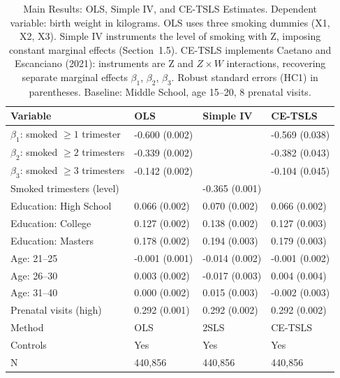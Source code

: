 \begin{table}[h!]
\centering
\caption{Main Results: OLS, Simple IV, and CE-TSLS Estimates. Dependent variable: birth weight in kilograms. OLS uses three smoking dummies (X1, X2, X3). Simple IV instruments the level of smoking with Z, imposing constant marginal effects (Section~1.5). CE-TSLS implements Caetano and Escanciano (2021): instruments are Z and $Z \times W$ interactions, recovering separate marginal effects $\beta_1$, $\beta_2$, $\beta_3$. Robust standard errors (HC1) in parentheses. Baseline: Middle School, age 15--20, 8 prenatal visits.} 
\label{tab:main_results}
\begingroup\small
\begin{tabular}{llll}
  \toprule
Variable & OLS & Simple IV & CE-TSLS \\ 
  \midrule
$\beta_1$: smoked $\geq 1$ trimester & -0.600 (0.002) &  & -0.569 (0.038) \\ 
  $\beta_2$: smoked $\geq 2$ trimesters & -0.339 (0.002) &  & -0.382 (0.043) \\ 
  $\beta_3$: smoked $\geq 3$ trimesters & -0.142 (0.002) &  & -0.104 (0.045) \\ 
  Smoked trimesters (level) &  & -0.365 (0.001) &  \\ 
  Education: High School & 0.066 (0.002) & 0.070 (0.002) & 0.066 (0.002) \\ 
  Education: College & 0.127 (0.002) & 0.138 (0.002) & 0.127 (0.003) \\ 
  Education: Masters & 0.178 (0.002) & 0.194 (0.003) & 0.179 (0.003) \\ 
  Age: 21--25 & -0.001 (0.001) & -0.014 (0.002) & -0.001 (0.002) \\ 
  Age: 26--30 & 0.003 (0.002) & -0.017 (0.003) & 0.004 (0.004) \\ 
  Age: 31--40 & 0.000 (0.002) & 0.015 (0.003) & -0.002 (0.003) \\ 
  Prenatal visits (high) & 0.292 (0.001) & 0.292 (0.002) & 0.292 (0.002) \\ 
  Method & OLS & 2SLS & CE-TSLS \\ 
  Controls & Yes & Yes & Yes \\ 
  N & 440,856 & 440,856 & 440,856 \\ 
   \bottomrule
\end{tabular}
\endgroup
\end{table}
